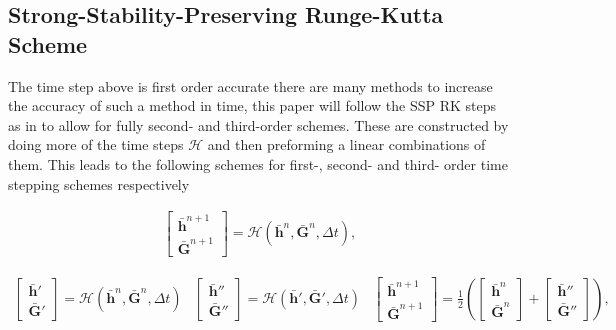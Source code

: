 \documentclass[SingleSpace,12pt]{Serre_ASCE}
\begin{document}
\subsection{Strong-Stability-Preserving Runge-Kutta Scheme} %
The time step above is first order accurate there are many methods to increase the accuracy of such a method in time, this paper will follow the SSP RK steps as in \cite{Gottlieb-etal-2009-251} to allow for fully second- and third-order schemes. These are constructed by doing more of the time steps $\mathcal{H}$ and then preforming a linear combinations of them. This leads to the following schemes for first-, second- and third- order time stepping schemes respectively
\begin{linenomath*}
\begin{gather}\label{eq:SSPRK1}
\left[\begin{array}{c}
 \boldsymbol{\bar{h}}^{n+1} \\
 \boldsymbol{\bar{G}}^{n+1} \end{array}\right] = \mathcal{H}\left(\boldsymbol{\bar{h}}^{n},\boldsymbol{\bar{G}}^{n},\Delta t\right),
\end{gather}
\end{linenomath*}
%
\begin{linenomath*}
\begin{subequations}
\begin{gather}\label{eq:SSPRK21}
\left[\begin{array}{c}
 \boldsymbol{\bar{h}}' \\
 \boldsymbol{\bar{G}}' \end{array}\right] = \mathcal{H}\left(\boldsymbol{\bar{h}}^{n},\boldsymbol{\bar{G}}^{n},\Delta t\right)
\end{gather}
\begin{gather}\label{eq:SSPRK22}
\left[\begin{array}{c}
 \boldsymbol{\bar{h}}'' \\
 \boldsymbol{\bar{G}}'' \end{array}\right] = \mathcal{H}\left(\boldsymbol{\bar{h}}',\boldsymbol{\bar{G}}',\Delta t\right)
\end{gather}
\begin{gather}\label{eq:SSPRK23}
\left[\begin{array}{c}
 \boldsymbol{\bar{h}}^{n+1} \\
 \boldsymbol{\bar{G}}^{n+1} \end{array}\right] = \frac{1}{2}\left(\left[\begin{array}{c}
  \boldsymbol{\bar{h}}^{n} \\
  \boldsymbol{\bar{G}}^{n} \end{array}\right] + \left[\begin{array}{c}
   \boldsymbol{\bar{h}}'' \\
   \boldsymbol{\bar{G}}'' \end{array}\right] \right),
\end{gather}
\end{subequations}
\label{eq:SSPRK2}
\end{linenomath*}
\end{document}
